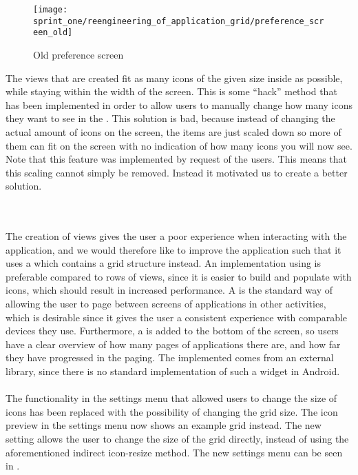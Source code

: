 \begin{figure}[!htbp]
    \centering
    \texttt{[image: sprint\_one/reengineering\_of\_application\_grid/preference\_screen\_old]}
    \caption{Old preference screen}
    \label{fig:preference_screen_old}
\end{figure}

The  views that are created fit as many icons of the given size inside as possible, while staying within the width of the screen. This is some ``hack'' method that has been implemented in order to allow users to manually change how many icons they want to see in the \launcher. This solution is bad, because instead of changing the actual amount of icons on the screen, the items are just scaled down so more of them can fit on the screen with no indication of how many icons you will now see. Note that this feature was implemented by request of the users. This means that this scaling cannot simply be removed. Instead it motivated us to create a better solution. 

\\\\
The creation of  views gives the user a poor experience when interacting with the application, and we would therefore like to improve the \launcher application such that it uses a  which contains a grid structure instead. An implementation using  is preferable compared to rows of  views, since it is easier to build and populate with icons, which should result in increased performance. A  is the standard way of allowing the user to page between screens of applications in other \launcher activities, which is desirable since it gives the user a consistent experience with comparable devices they use. Furthermore, a  is added to the bottom of the screen, so users have a clear overview of how many pages of applications there are, and how far they have progressed in the paging. The implemented  comes from an external library\parencite{view_pager_indicator_avianey}, since there is no standard implementation of such a widget in Android. 
\\\\
The functionality in the settings menu that allowed users to change the size of icons has been replaced with the possibility of changing the \launcher grid size. The icon preview in the settings menu now shows an example grid instead. The new setting allows the user to change the size of the grid directly, instead of using the aforementioned indirect icon-resize method. The new settings menu can be seen in .

